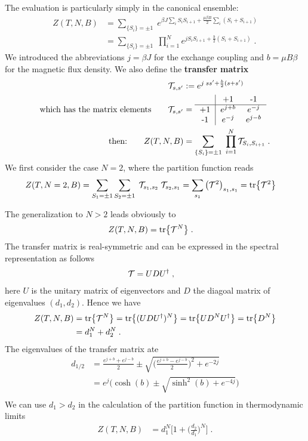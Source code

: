 The evaluation is particularly simply in the canonical ensemble:
\begin{align*}
Z(T,N,B) &= \sum_{\{S_{i}\}=\pm 1}\; e^{\beta J \sum_{ i} S_{i }S_{i+1} + \frac{\mu\beta B}{2} \sum_{i} (S_{i}+S_{i+1})}\\
 &= \sum_{\{S_{i}\}=\pm 1}\;
 \prod_{i=1}^{N}
  e^{j  S_{i }S_{i+1} + \frac{b}{2} (S_{i}+S_{i+1})}\;.
\end{align*}
%
We introduced the abbreviations $j = \beta J$ for the exchange coupling and $b = \mu B \beta$ for the magnetic flux density.
We also define the 
{\bf transfer matrix}
%
\begin{subequations}\label{eq:transfer:1d}
\begin{align}
{\cal T}_{s,s'} &:=   e^{j \; s s' + \frac{b}{2} (s + s')}\\
%
\text{which has the  matrix elements}\qquad
{\cal T}_{s,s'}&=
\begin{tabular}{c|ccc}   & +1 & -1 \\\hline+1 & $e^{j+b}$ & $e^{-j}$  \\-1 & $e^{-j}$ & $e^{j-b}$
\end{tabular}\\
%
\text{then:}\qquad Z(T,N,B)&= \sum_{\{S_{i}\}=\pm 1}\;
 \prod_{i=1}^{N} {\cal T}_{S_{i},S_{i+1}}\;.
\end{align}
\end{subequations}
%
We first consider the case $N=2$, where the partition function reads
%
\begin{align*}
Z(T,N=2,B) &= \sum_{S_{1}=\pm 1}\sum_{S_{2}=\pm 1}\;
{\cal T}_{s_{1},s_{2}}\;{\cal T}_{s_{2},s_{1}} = \sum_{s_{1}} \big({\cal T}^{2}\big)_{s_{1},s_{1}} = \tr{{\cal T}^{2}}
\end{align*}
%

The generalization to $N>2$ leads  obviously to
%
\begin{align*}
Z(T,N,B) &= \tr{{\cal T}^{N}}\;.
\end{align*}
%
The transfer matrix is real-symmetric and can be expressed in the spectral representation as follows
%
\begin{align*}
{\cal T} &= U D U^\dagger\;,
\end{align*}
%
here  $U$ is the unitary matrix of eigenvectors and  $D$ the diagoal matrix of eigenvalues
 $(d_{1},d_{2})$. Hence we have
%
\begin{align*}
Z(T,N,B) &= \tr{{\cal T}^{N}}= \tr{(U D U^{\dagger})^{N}} =\tr{U D^{N} U^{\dagger}} = \tr{D^{N}}\\
&= d_{1}^{N} + d_{2}^{N}\;.
\end{align*}
% 
The eigenvalues of the transfer matrix ate
%
\begin{align*}
d_{1/2} &= \frac{e^{j+b}+e^{j-b} }{2} \pm
\sqrt{ \bigg(
\frac{e^{j+b}-e^{j-b} }{2}
\bigg)	^{2} + e^{-2 j}}\\
&= e^{j} \bigg(\cosh(b) \pm \sqrt{\sinh^{2}(b) + e^{-4j}}\bigg)\\
\end{align*}
We can use $d_{1}>d_{2}$ in the calculation of the partition function  in thermodynamic limits
%
\begin{align*}
Z(T,N,B) &= d_{1}^{N}\bigg[
1 + 
\bigg(
\frac{d_{2}}{d_{1}}
\bigg)^{N}
\bigg]\;.
\end{align*}
%
%
